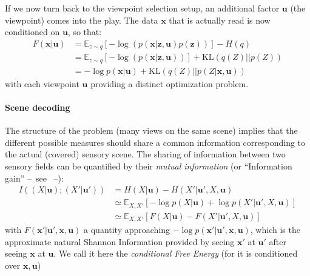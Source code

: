 \documentclass[12pt,twoside,openright]{article}
\begin{document}
If we now turn back to the viewpoint selection setup, an additional factor $\boldsymbol{u}$ (the viewpoint) comes into the play. The data $\boldsymbol{x}$ that is actually read is now conditioned on  $\boldsymbol{u}$, so that:
\begin{align}
F(\boldsymbol{x}|\boldsymbol{u}) 
&= \mathbb{E}_{z\sim q} \left[-\log (p(\boldsymbol{x}|\boldsymbol{z},\boldsymbol{u})p(\boldsymbol{z}))\right] - H(q)\\
&= \mathbb{E}_{z\sim q} \left[-\log (p(\boldsymbol{x}|\boldsymbol{z},\boldsymbol{u}))\right] +\text{KL}(q(Z)||p(Z))
\label{eq:FEP-prior-u}\\
&= - \log p(\boldsymbol{x}|\boldsymbol{u}) + \text{KL}(q(Z)||p(Z|\boldsymbol{x}, \boldsymbol{u}))
\label{eq:FEP-posterior-u}\end{align}
with each viewpoint $\boldsymbol{u}$ providing a distinct optimization problem. 
 
\paragraph{Scene decoding}
The structure of the problem (many views on the same scene) implies that the different possible measures should share a common information corresponding to the actual (covered) sensory scene. The sharing of information between two sensory fields can be quantified by their \emph{mutual information} (or ``Information gain'' --~see \cite{tishby2011information}~--):
\begin{align}
I((X| \boldsymbol{u}); (X'| \boldsymbol{u}')) &= H(X| \boldsymbol{u}) - H(X'| \boldsymbol{u}', X, \boldsymbol{u})\\
&\simeq \mathbb{E}_{X,X'} \left[-\log p(X| \boldsymbol{u}) + \log p(X'| \boldsymbol{u}', X, \boldsymbol{u})\right] \nonumber\\
&\simeq \mathbb{E}_{X,X'} \left[F(X|\boldsymbol{u}) - F(X'|\boldsymbol{u}', X, \boldsymbol{u})\right] \label{eq:infomax}
\end{align}
with $F(\boldsymbol{x}'|\boldsymbol{u}', \boldsymbol{x}, \boldsymbol{u})$ a quantity approaching  $-\log p(\boldsymbol{x}'| \boldsymbol{u}', \boldsymbol{x}, \boldsymbol{u})$, which is the approximate natural Shannon Information provided by seeing $\boldsymbol{x}'$ at $\boldsymbol{u}'$ after seeing $\boldsymbol{x}$ at $\boldsymbol{u}$. We call it here the \emph{conditional Free Energy} (for it is conditioned over $\boldsymbol{x}, \boldsymbol{u}$)
\end{document}
